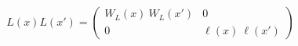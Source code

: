 \begin{equation}
L(x)L(x')=\left(
\begin{array}{cc}
W_{L}(x)~W_{L}(x') & 0 \\
0 & \ell (x)~\ell (x')
\end{array}
\right)
\end{equation}

